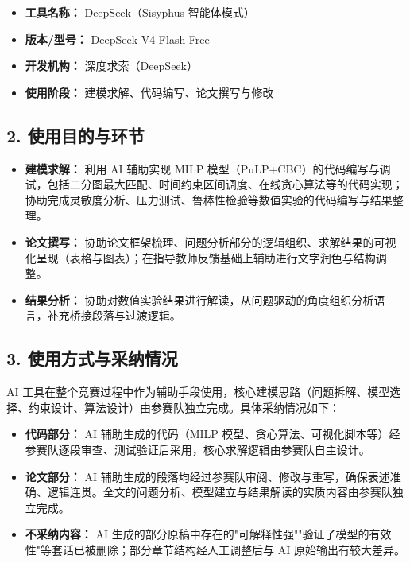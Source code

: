 \documentclass{ctexart}
\begin{document}
\begin{itemize}
  \item \textbf{工具名称：} DeepSeek（Sisyphus 智能体模式）
  \item \textbf{版本/型号：} DeepSeek-V4-Flash-Free
  \item \textbf{开发机构：} 深度求索（DeepSeek）
  \item \textbf{使用阶段：} 建模求解、代码编写、论文撰写与修改
\end{itemize}

\subsection*{2. 使用目的与环节}

\begin{itemize}
  \item \textbf{建模求解：} 利用 AI 辅助实现 MILP 模型（PuLP+CBC）的代码编写与调试，包括二分图最大匹配、时间约束区间调度、在线贪心算法等的代码实现；协助完成灵敏度分析、压力测试、鲁棒性检验等数值实验的代码编写与结果整理。
  \item \textbf{论文撰写：} 协助论文框架梳理、问题分析部分的逻辑组织、求解结果的可视化呈现（表格与图表）；在指导教师反馈基础上辅助进行文字润色与结构调整。
  \item \textbf{结果分析：} 协助对数值实验结果进行解读，从问题驱动的角度组织分析语言，补充桥接段落与过渡逻辑。
\end{itemize}

\subsection*{3. 使用方式与采纳情况}

AI 工具在整个竞赛过程中作为辅助手段使用，核心建模思路（问题拆解、模型选择、约束设计、算法设计）由参赛队独立完成。具体采纳情况如下：

\begin{itemize}
  \item \textbf{代码部分：} AI 辅助生成的代码（MILP 模型、贪心算法、可视化脚本等）经参赛队逐段审查、测试验证后采用，核心求解逻辑由参赛队自主设计。
  \item \textbf{论文部分：} AI 辅助生成的段落均经过参赛队审阅、修改与重写，确保表述准确、逻辑连贯。全文的问题分析、模型建立与结果解读的实质内容由参赛队独立完成。
  \item \textbf{不采纳内容：} AI 生成的部分原稿中存在的"可解释性强""验证了模型的有效性"等套话已被删除；部分章节结构经人工调整后与 AI 原始输出有较大差异。
\end{itemize}
\end{document}
